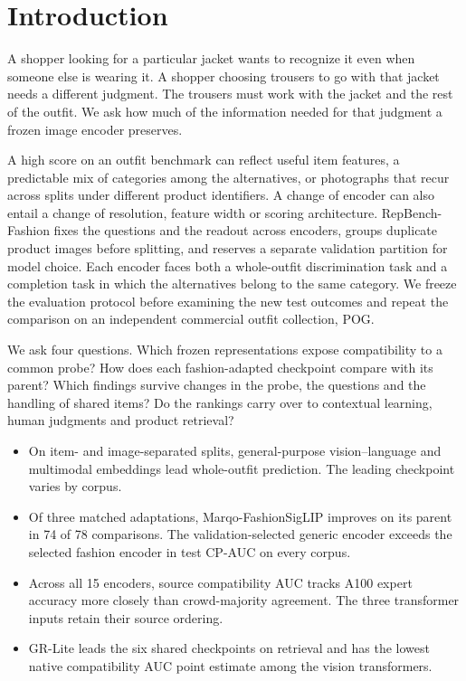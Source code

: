 \section{Introduction}

A shopper looking for a particular jacket wants to recognize it even when someone else is wearing it. A shopper choosing trousers to go with that jacket needs a different judgment. The trousers must work with the jacket and the rest of the outfit. We ask how much of the information needed for that judgment a frozen image encoder preserves.

A high score on an outfit benchmark can reflect useful item features, a predictable mix of categories among the alternatives, or photographs that recur across splits under different product identifiers. A change of encoder can also entail a change of resolution, feature width or scoring architecture. RepBench-Fashion fixes the questions and the readout across encoders, groups duplicate product images before splitting, and reserves a separate validation partition for model choice. Each encoder faces both a whole-outfit discrimination task and a completion task in which the alternatives belong to the same category. We freeze the evaluation protocol before examining the new test outcomes and repeat the comparison on an independent commercial outfit collection, POG.

We ask four questions. Which frozen representations expose compatibility to a common probe? How does each fashion-adapted checkpoint compare with its parent? Which findings survive changes in the probe, the questions and the handling of shared items? Do the rankings carry over to contextual learning, human judgments and product retrieval?
\begin{itemize}
\item On item- and image-separated splits, general-purpose vision--language and multimodal embeddings lead whole-outfit prediction. The leading checkpoint varies by corpus.
\item Of three matched adaptations, Marqo-FashionSigLIP improves on its parent in 74 of 78 comparisons. The validation-selected generic encoder exceeds the selected fashion encoder in test CP-AUC on every corpus.
\item Across all 15 encoders, source compatibility AUC tracks A100 expert accuracy more closely than crowd-majority agreement. The three transformer inputs retain their source ordering.
\item GR-Lite leads the six shared checkpoints on retrieval and has the lowest native compatibility AUC point estimate among the vision transformers.
\end{itemize}

